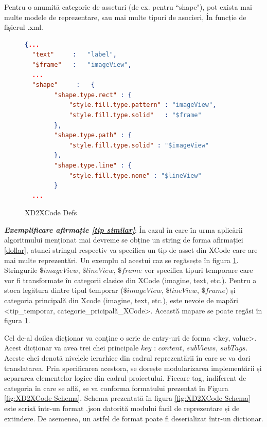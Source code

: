 \begin{myNote}\label{tip similar}

Pentru o anumită categorie de asseturi (de ex. pentru ``shape"), pot exista mai multe modele de reprezentare, sau mai multe tipuri de asocieri, În funcție de fișierul .xml.
\end{myNote}

\begin{figure}[!htbp]
\begin{lstlisting}[language=json,firstnumber=1]
  {...
  "text"     :   "label",
  "$frame"   :   "imageView",
  ...
  "shape"     :   {
        "shape.type.rect" : {
            "style.fill.type.pattern" : "imageView",
            "style.fill.type.solid"   : "$frame"
        },
        "shape.type.path" : {
            "style.fill.type.solid" : "$imageView"
        },
        "shape.type.line" : {
            "style.fill.type.none" : "$lineView"
        }
  ...
\end{lstlisting}
\caption{XD2XCode Defs} \label{fig:XD2XCode Defs}
\end{figure}

\textbf{\textit{Exemplificare afirmație \ref{tip similar}}}: În cazul în care în urma aplicării algoritmului menționat mai devreme se obține un string de forma afirmației \ref{dollar}, atunci stringul respectiv va specifica un tip de asset din XCode care are mai multe reprezentări. Un exemplu al acestui caz se regăsește în figura \ref{fig:XD2XCode Defs}. Stringurile $\$imageView$, $\$lineView$, $\$frame$ vor specifica tipuri temporare care vor fi transformate în categorii clasice din XCode (imagine, text, etc.). Pentru a stoca legătura dintre tipul temporar ($\$imageView$, $\$lineView$, $\$frame$) și categoria principală din Xcode (imagine, text, etc.), este nevoie de mapări <tip_temporar, categorie_pricipală_XCode>. Această mapare se poate regăsi în figura \ref{fig:XD2XCode Defs}.

Cel de-al doilea dicționar va conține o serie de entry-uri de forma <key, value>. Acest dicționar va avea trei chei principale $key$ : $content$, $subViews$, $subTags$. Aceste chei denotă nivelele ierarhice din cadrul reprezentării în care se va dori translatarea. Prin specificarea acestora, se dorește modularizarea implementării și separarea elementelor logice din cadrul proiectului. Fiecare tag, indiferent de categoria în care se află, se va conforma formatului prezentat în Figura \ref{fig:XD2XCode Schema}.
Schema prezentată în figura \ref{fig:XD2XCode Schema} este scrisă într-un format .json datorită modului facil de reprezentare și de extindere. De asemenea, un astfel de format poate fi deserializat într-un dictionar. 

